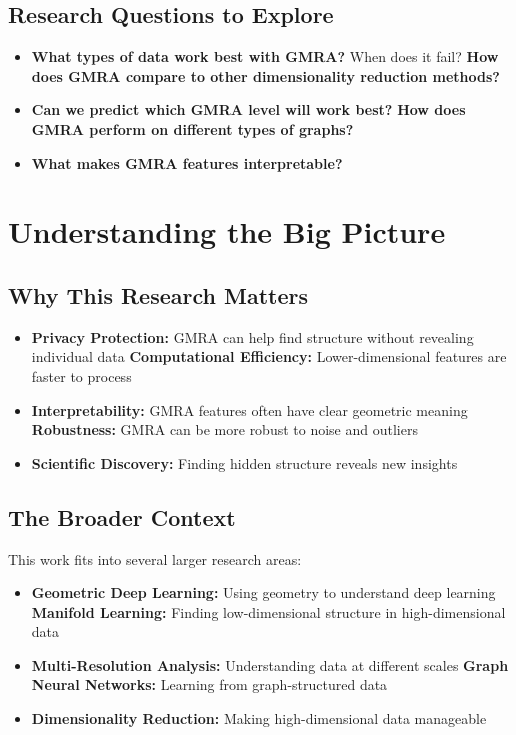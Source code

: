 \documentclass[12pt]{article}
\begin{document}
\subsection{Research Questions to Explore}

\begin{itemize}
    \item \textbf{What types of data work best with GMRA?} When does it fail?
    \textbf{How does GMRA compare to other dimensionality reduction methods?}
    \item \textbf{Can we predict which GMRA level will work best?}
    \textbf{How does GMRA perform on different types of graphs?}
    \item \textbf{What makes GMRA features interpretable?}
\end{itemize}

\section{Understanding the Big Picture}

\subsection{Why This Research Matters}

\begin{itemize}
    \item \textbf{Privacy Protection:} GMRA can help find structure without revealing individual data
    \textbf{Computational Efficiency:} Lower-dimensional features are faster to process
    \item \textbf{Interpretability:} GMRA features often have clear geometric meaning
    \textbf{Robustness:} GMRA can be more robust to noise and outliers
    \item \textbf{Scientific Discovery:} Finding hidden structure reveals new insights
\end{itemize}

\subsection{The Broader Context}

This work fits into several larger research areas:
\begin{itemize}
    \item \textbf{Geometric Deep Learning:} Using geometry to understand deep learning
    \textbf{Manifold Learning:} Finding low-dimensional structure in high-dimensional data
    \item \textbf{Multi-Resolution Analysis:} Understanding data at different scales
    \textbf{Graph Neural Networks:} Learning from graph-structured data
    \item \textbf{Dimensionality Reduction:} Making high-dimensional data manageable
\end{itemize}
\end{document}
